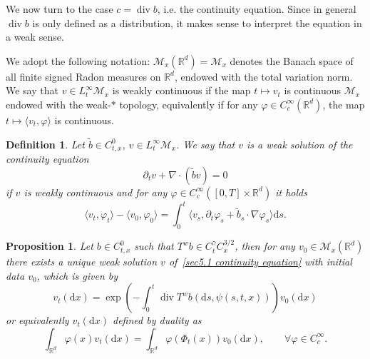 \documentclass[10pt]{article}
\newcommand{\mathd}{\mathrm{d}}
\newcommand{\tmop}[1]{\ensuremath{\operatorname{#1}}}
\newtheorem{definition}{Definition}
\newtheorem{proposition}{Proposition}
{\theorembodyfont{\rmfamily}\newtheorem{remark}{Remark}}
\begin{document}
We now turn to the case $c = \tmop{div} b$, i.e. the continuity equation.
Since in general $\tmop{div} b$ is only defined as a distribution, it makes
sense to interpret the equation in a weak sense.

We adopt the following notation: $\mathcal{M}_x (\mathbb{R}^d) =
\mathcal{M}_x$ denotes the Banach space of all finite signed Radon measures on
$\mathbb{R}^d$, endowed with the total variation norm. We say that $v \in
L^{\infty}_t \mathcal{M}_x$ is weakly continuous if the map $t \mapsto v_t$ is
continuous $\mathcal{M}_x$ endowed with the weak-$\ast$ topology, equivalently
if for any $\varphi \in C^{\infty}_c (\mathbb{R}^d)$, the map $t \mapsto
\langle v_t, \varphi \rangle$ is continuous.

\begin{definition}
  \label{sec5.1 defn continuity equation}Let $\tilde{b} \in C^0_{t, x}$, $v
  \in L^{\infty}_t \mathcal{M}_x$. We say that $v$ is a weak solution of the
  continuity equation
  \begin{equation}
    \partial_t v + \nabla \cdot (\tilde{b} v) = 0 \label{sec5.1 continuity
    equation}
  \end{equation}
  if $v$ is weakly continuous and for any $\varphi \in C^{\infty}_c ([0, T]
  \times \mathbb{R}^d)$ it holds
  \begin{equation}
    \langle v_t, \varphi_t \rangle - \langle v_0, \varphi_0 \rangle = \int_0^t
    \langle v_s, \partial_t \varphi_s + \tilde{b}_s \cdot \nabla \varphi_s
    \rangle \mathd s. \label{sec5.1 weak continuity equation}
  \end{equation}
\end{definition}

\begin{proposition}
  \label{sec5.1 thm continuity}Let $b \in C^0_{t, x}$ such that $T^w b \in
  C^{\gamma}_t C^{3 / 2}_x$, then for any $v_0 \in \mathcal{M}_x
  (\mathbb{R}^d)$ there exists a unique weak solution $v$ of~{\eqref{sec5.1
  continuity equation}} with initial data $v_0$, which is given by
  \begin{equation}
    v_t (\mathd x) = \exp \left( - \int_0^t \tmop{div} T^w b (\mathd s, \psi
    (s, t, x)) \right) v_0 (\mathd x) \label{sec5.1 solution continuity ugly}
  \end{equation}
  or equivalently $v_t (\mathd x)$ defined by duality as
  \begin{equation}
    \int_{\mathbb{R}^d} \varphi (x) v_t (\mathd x) = \int_{\mathbb{R}^d}
    \varphi (\Phi_t (x)) v_0 (\mathd x), \qquad \forall \varphi \in
    C^{\infty}_c . \label{sec5.1 solution continuity eq}
  \end{equation}
\end{proposition}
\end{document}
